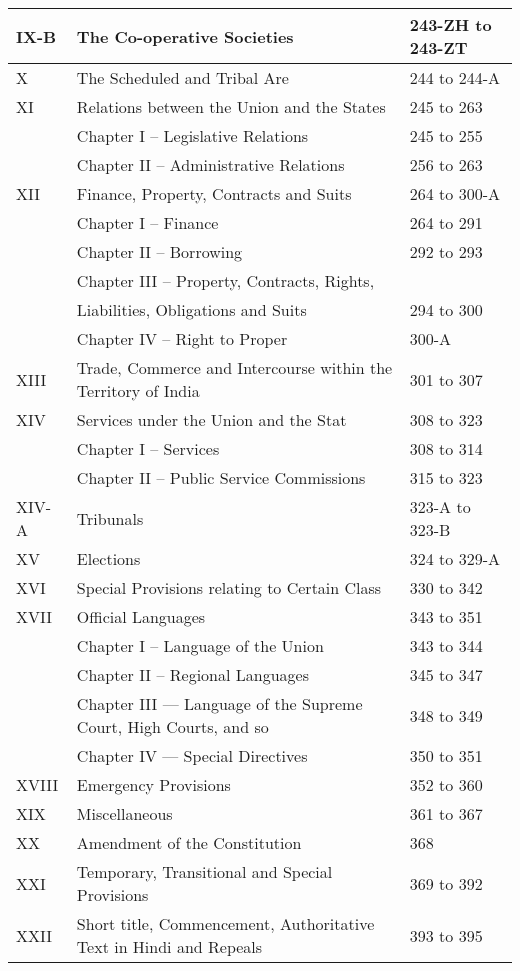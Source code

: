 \begin{longtable}[c]{@{}|p{1cm}|p{7cm}|p{4cm}|@{}}
  IX-B & The Co-operative Societies & 243-ZH to 243-ZT \\\midrule
  X & The Scheduled and Tribal Are & 244 to 244-A \\\midrule
  XI & Relations between the Union and the States & 245 to 263 \\
  & Chapter I – Legislative Relations & 245 to 255 \\
  & Chapter II – Administrative Relations & 256 to 263 \\\midrule
  XII & Finance, Property, Contracts and Suits & 264 to 300-A \\*\midrule
  & Chapter I – Finance & 264 to 291 \\
  & Chapter II – Borrowing & 292 to 293 \\
  & Chapter III – Property, Contracts, Rights, &  \\
  & Liabilities, Obligations and Suits & 294 to 300 \\
  & Chapter IV – Right to Proper & 300-A \\ \midrule
  XIII & Trade, Commerce and Intercourse within the Territory of India & 301 to 307 \\\midrule
  XIV & Services under the Union and the Stat & 308 to 323 \\
  & Chapter I – Services & 308 to 314 \\
  & Chapter II – Public Service Commissions & 315 to 323 \\\midrule
  XIV-A & Tribunals & 323-A to 323-B \\\midrule
  XV & Elections & 324 to 329-A \\\midrule
  XVI & Special Provisions relating to Certain Class & 330 to 342 \\\midrule
  XVII & Official Languages & 343 to 351 \\
  & Chapter I – Language of the Union & 343 to 344 \\
  & Chapter II – Regional Languages & 345 to 347 \\
  & Chapter III — Language of the Supreme Court, High Courts, and so & 348 to 349 \\
  & Chapter IV — Special Directives & 350 to 351 \\\midrule
  XVIII & Emergency Provisions & 352 to 360 \\\midrule
  XIX & Miscellaneous & 361 to 367 \\\midrule
  XX & Amendment of the Constitution & 368 \\\midrule
  XXI & Temporary, Transitional and Special Provisions & 369 to 392 \\\midrule
  XXII & Short title, Commencement, Authoritative Text in Hindi and Repeals & 393 to 395\\\bottomrule
\end{longtable}

